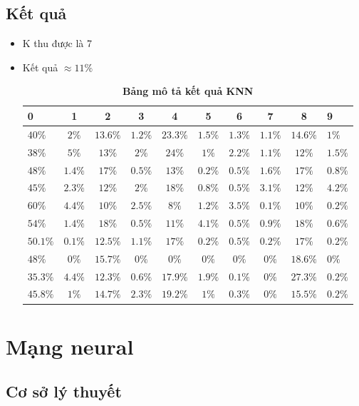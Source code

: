 \documentclass[a4paper,12pt]{report}
\begin{document}
\subsection{Kết quả}
\begin{itemize}
\item K thu được là 7
\item Kết quả $\approx 11\% $
\begin{center}
\begin{longtable}{lccccccccl}
\caption{\textbf{Bảng mô tả kết quả KNN}}
\endfirsthead
\endhead
\hline
0       &    1   &   2    &     3    &    4    &    5    &    6    &     7   &    8    &    9  \\
\hline
$40\%$  & $2\%$   & $13.6\%$ & $1.2\%$   & $23.3\%$ & $1.5\%$  & $1.3\%$  & $1.1\%$  & $14.6\%$ & $1\%$\\
\hline
$38\%$  & $5\%$   & $13\%$ & $2\%$   & $24\%$ & $1\%$  & $2.2\%$  & $1.1\%$  & $12\%$ & $1.5\%$\\
\hline
$48\%$  & $1.4\%$   & $17\%$ & $0.5\%$   & $13\%$ & $0.2\%$  & $0.5\%$  & $1.6\%$  & $17\%$ & $0.8\%$\\
\hline
$45\%$  & $2.3\%$   & $12\%$ & $2\%$   & $18\%$ & $0.8\%$  & $0.5\%$  & $3.1\%$  & $12\%$ & $4.2\%$\\
\hline
$60\%$  & $4.4\%$   & $10\%$ & $2.5\%$   & $8\%$ & $1.2\%$  & $3.5\%$  & $0.1\%$  & $10\%$ & $0.2\%$\\
\hline
$54\%$  & $1.4\%$   & $18\%$ & $0.5\%$   & $11\%$ & $4.1\%$  & $0.5\%$  & $0.9\%$  & $18\%$ & $0.6\%$\\
\hline
$50.1\%$  & $0.1\%$   & $12.5\%$ & $1.1\%$   & $17\%$ & $0.2\%$  & $0.5\%$  & $0.2\%$  & $17\%$ & $0.2\%$\\
\hline
$48\%$  & $0\%$   & $15.7\%$ & $0\%$   & $0\%$ & $0\%$  & $0\%$  & $0\%$  & $18.6\%$ & $0\%$\\
\hline
$35.3\%$  & $4.4\%$   & $12.3\%$ & $0.6\%$   & $17.9\%$ & $1.9\%$  & $0.1\%$  & $0\%$  & $27.3\%$ & $0.2\%$\\
\hline
$45.8\%$  & $1\%$   & $14.7\%$ & $2.3\%$   & $19.2\%$ & $1\%$  & $0.3\%$  & $0\%$  & $15.5\%$ & $0.2\%$\\
\hline
\end{longtable} 
\end{center}
\end{itemize}
\section{Mạng neural}
\subsection{Cơ sở lý thuyết}
\end{document}
